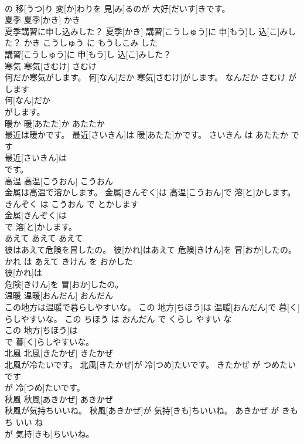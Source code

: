 \documentclass[8pt]{extreport}
\begin{document}
\begin{CJK}{UTF8}{min}
\\	の 移[うつ]り 変[か]わりを 見[み]るのが 大好[だいす]きです。			
\\	夏季	夏季[かき]	かき	
\\	夏季講習に申し込みした？	夏季[かき] 講習[こうしゅう]に 申[もう]し 込[こ]みした？	かき こうしゅう に もうしこみ した 
\\	講習[こうしゅう]に 申[もう]し 込[こ]みした？			
\\	寒気	寒気[さむけ]	さむけ	
\\	何だか寒気がします。	何[なん]だか 寒気[さむけ]がします。	なんだか さむけ が します	
\\	何[なん]だか
\\	がします。			
\\	暖か	暖[あたた]か	あたたか	
\\	最近は暖かです。	最近[さいきん]は 暖[あたた]かです。	さいきん は あたたか です	
\\	最近[さいきん]は
\\	です。			
\\	高温	高温[こうおん]	こうおん	
\\	金属は高温で溶かします。	金属[きんぞく]は 高温[こうおん]で 溶[と]かします。	きんぞく は こうおん で とかします	
\\	金属[きんぞく]は
\\	で 溶[と]かします。			
\\	あえて	あえて	あえて	
\\	彼はあえて危険を冒したの。	彼[かれ]はあえて 危険[きけん]を 冒[おか]したの。	かれ は あえて きけん を おかした	
\\	彼[かれ]は
\\	危険[きけん]を 冒[おか]したの。			
\\	温暖	温暖[おんだん]	おんだん	
\\	この地方は温暖で暮らしやすいな。	この 地方[ちほう]は 温暖[おんだん]で 暮[く]らしやすいな。	この ちほう は おんだん で くらし やすい な	
\\	この 地方[ちほう]は
\\	で 暮[く]らしやすいな。			
\\	北風	北風[きたかぜ]	きたかぜ	
\\	北風が冷たいです。	北風[きたかぜ]が 冷[つめ]たいです。	きたかぜ が つめたい です	
\\	が 冷[つめ]たいです。			
\\	秋風	秋風[あきかぜ]	あきかぜ	
\\	秋風が気持ちいいね。	秋風[あきかぜ]が 気持[きも]ちいいね。	あきかぜ が きもち いい ね	
\\	が 気持[きも]ちいいね。			

\end{CJK}
\end{document}
